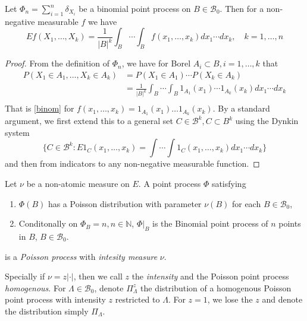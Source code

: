 \begin{proposition}\label{bincalc}
Let $\Phi_n = \sum^{n}_{i=1}  \delta_{X_i}$ be a binomial point process on $B\in\mathcal B_0$. Then for a non-negative measurable $f$ we have
\begin{equation}\label{binom}
Ef(X_1,\dots, X_k) = \frac 1{|B|^k} \int_B \cdots \int_B f(x_1,\dots, x_k) dx_1 \cdots dx_k, \quad k = 1,\dots, n
\end{equation}
\end{proposition}
\begin{proof}
From the definition of $\Phi_n$, we have for Borel $A_i \subset B, i=1,\dots,k$ that
\begin{align*}
P(X_1 \in A_1, \dots, X_k \in A_k) &= P(X_1\in A_1)\cdots P(X_k\in A_k) \\ 
& = \frac 1{|B|^k} \int_B \cdots \int_B 1_{A_1}(x_1) \cdots 1_{A_k}(x_k) dx_1 \cdots dx_k \\
\end{align*}
That is \ref{binom} for $f(x_1,\dots,x_k)=1_{A_1}(x_1)\dots 1_{A_k}(x_k)$. By a standard argument, we first extend this to a general set $C \in \mathcal B^k, C\subset B^k$ using the Dynkin system 
$$\{C \in \mathcal B^k: E 1_C (x_1,\dots,x_k) = \int \cdots \int 1_C(x_1,\dots, x_k) dx_1 \cdots dx_k \}$$
 and then from indicators to any non-negative measurable function.
\end{proof}




\begin{definition} Let $\nu$ be a non-atomic measure on $E$. A point process $\Phi$ satisfying
\begin{enumerate}
\item $\Phi(B)$ has a Poisson distribution with parameter $\nu(B)$ for each $B\in \mathcal B_0$,
\item Conditonally on $\Phi_B=n, n\in\mathbb N$,  $\Phi|_B$ is the Binomial point process of $n$ points in $B$, $B \in \mathcal B_0$.
\end{enumerate}
is a \textit{Poisson process} with \textit{intesity measure} $\nu$.

Specially if $\nu = z|\cdot |$, then we call $z$ the \textit{intensity} and the Poisson point process \textit{homogenous}. \newline
For $\Lambda \in \mathcal B_0$, denote $\Pi^z_\Lambda$ the distribution of a homogenous Poisson point process with intensity $z$ restricted to $\Lambda$.  For $z=1$, we lose the $z$ and denote the distribution simply $\Pi_\Lambda$.
\end{definition}

